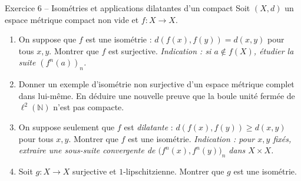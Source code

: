 \documentclass[11pt,a4paper]{article}
\newcommand{\N}{\mathbb{N}}
\theoremstyle{definition}
\begin{document}
\begin{exo}{Exercice 6 -- Isométries et applications dilatantes d'un compact}
Soit $(X,d)$ un espace métrique compact non vide et $f:X\to X$.
\begin{enumerate}[label=(\alph*)]
  \item On suppose que $f$ est une isométrie : $d(f(x),f(y))=d(x,y)$ pour tous $x,y$. Montrer que $f$ est surjective. \emph{Indication : si $a\notin f(X)$, étudier la suite $(f^n(a))_n$.}
  \item Donner un exemple d'isométrie non surjective d'un espace métrique complet dans lui-même. En déduire une nouvelle preuve que la boule unité fermée de $\ell^2(\N)$ n'est pas compacte.
  \item On suppose seulement que $f$ est \emph{dilatante} : $d(f(x),f(y))\ge d(x,y)$ pour tous $x,y$. Montrer que $f$ est une isométrie. \emph{Indication : pour $x,y$ fixés, extraire une sous-suite convergente de $\big(f^n(x),f^n(y)\big)_n$ dans $X\times X$.}
  \item Soit $g:X\to X$ surjective et $1$-lipschitzienne. Montrer que $g$ est une isométrie.
\end{enumerate}
\end{exo}
\end{document}
